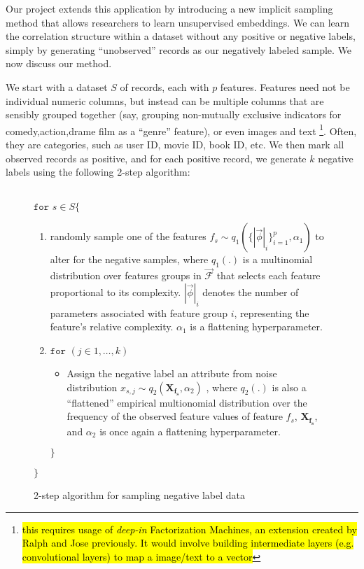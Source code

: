 \documentclass{article} %
\newcommand{\vect}[1]{\vec{#1}}
\begin{document}
Our project extends this application by introducing a new implicit sampling method that allows researchers to learn unsupervised embeddings. We can learn the correlation structure within a dataset without any positive or negative labels, simply by generating ``unobserved'' records as our negatively labeled sample. We now discuss our method.

We start with a dataset $S$ of records, each with $p$ features. Features need not be individual numeric columns, but instead can be multiple columns that are sensibly grouped together (say, grouping non-mutually exclusive indicators for comedy,action,drame film as a ``genre'' feature), or even images and text
\footnote{\hl{this requires usage of \textit{deep-in} Factorization Machines, an extension created by Ralph and Jose previously. It would involve building intermediate layers (e.g. convolutional layers) to map a image/text to a vector}}.
Often, they are categories, such as user ID, movie ID, book ID, etc. We then mark all observed records as positive, and for each positive record, we generate $k$ negative labels using the following 2-step algorithm:
\\ \\
\begin{figure}[h!]
\begin{tcolorbox}
\noindent$\texttt{for }  s \in S \{$
\begin{enumerate}
	\item randomly sample  one of the features	$ f_s \sim q_1(\{|\vec{\phi}|_i\}_{i=1}^p,\alpha_1) $ to alter for the negative samples, where $q_1(.)$ is a multinomial distribution over features groups in $\vect{\mathcal{F}}$ that selects each feature proportional to its complexity.
  $|\vec{\phi}|_i$ denotes the number of parameters associated with feature group $i$, representing the feature's relative complexity.
  $\alpha_1$ is a flattening hyperparameter.
	\item $\texttt{for } (j \in 1,\ldots,k)$
	\begin{itemize}
		\item Assign the negative label an attribute from noise distribution $x_{s,j} \sim q_2(\mathbf{X_{f_s}},\alpha_2)$ , where $q_2(.)$ is also a  ``flattened'' empirical multionomial distribution over the frequency of the observed feature values of feature $f_s$, $\mathbf{X_{f_s}}$, and $\alpha_2$ is once again a flattening hyperparameter.
	\end{itemize}
	$\}$
\end{enumerate}
$\}$
\end{tcolorbox}
\caption{2-step algorithm for sampling negative label data}
\end{figure}
\end{document}
